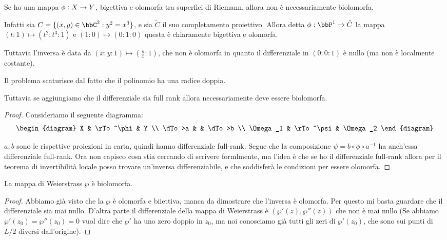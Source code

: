 
	Se ho una mappa $\phi: X \rightarrow Y$, bigettiva e olomorfa tra superfici di Riemann, allora non è necessariamente biolomorfa.

	Infatti sia $C = \{ (x,y) \in \bbC^2 : y^2=x^3 \}$, e sia $\tilde C$ il suo completamento proiettivo. Allora detta $\phi: \bbP^1 \rar \tilde C$ la mappa $ (t : 1) \mapsto (t^2 : t^3 : 1)$ e $(1 : 0) \mapsto (0:1:0)$ questa è chiaramente bigettiva e olomorfa.

	Tuttavia l'inversa è data da $(x:y:1) \mapsto (\frac yx:1)$, che non è olomorfa in quanto il differenziale in $(0:0:1)$ è nullo (ma non è localmente costante).

	Il problema scaturisce dal fatto che il polinomio ha una radice doppia.

	Tuttavia se aggiungiamo che il differenziale sia full rank allora necessariamente deve essere biolomorfa.
	\begin{proof}
		Consideriamo il seguente diagramma:
		\[
		\begin{diagram}
			X & \rTo^\phi & Y \\
			\dTo>a & & \dTo>b \\
			\Omega_1 & \rTo^\psi & \Omega_2
		\end{diagram}
		\]

		$a, b$ sono le rispettive proiezioni in carta, quindi hanno differenziale full-rank. Segue che la composizione $\psi = b\circ \phi \circ a^{-1}$ ha anch'essa differenziale full-rank.
		Ora non capisco cosa stia cercando di scrivere formlmente, ma l'idea è che se ho il differenziale full-rank allora per il teorema di invertibilità locale posso trovare un'inversa differenziabile, e che soddisferà le condizioni per essere olomorfa. %
	\end{proof}

	\begin{proposizione}
		La mappa di Weierstrass $\wp$ è biolomorfa.
	\end{proposizione}
	\begin{proof}
		Abbiamo già visto che la $\wp$ è olomorfa e biiettiva, manca da dimostrare che l'inversa è olomorfa.
		Per questo mi basta guardare che il differenziale sia mai nullo. D'altra parte il differenziale della mappa di Weierstrass è $ (\wp'(z), \wp''(z))$ che non è mai nullo (Se abbiamo $\wp'(z_0) = \wp''(z_0) = 0$ vuol dire che $\wp'$ ha uno zero doppio in $z_0$, ma noi conosciamo già tutti gli zeri di $\wp'(z_0)$, che sono sui punti di $L/2$ diversi dall'origine).
	\end{proof}

